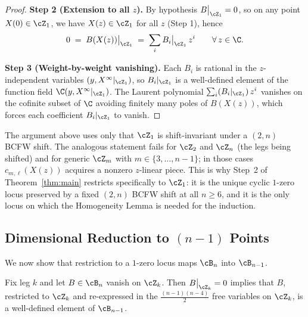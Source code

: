 \begin{proof}
\textbf{Step 2 (Extension to all $z$).}
By hypothesis $B\big|_{\cZ_1} = 0$, so on any point
$X(0) \in \cZ_1$, we have $X(z) \in \cZ_1$ for all $z$
(Step 1), hence
\[
  0 \;=\; B(X(z))\big|_{\cZ_1}
  \;=\; \sum_i B_i\big|_{\cZ_1}\, z^i
  \qquad \forall\, z \in \C.
\]

\textbf{Step 3 (Weight-by-weight vanishing).}
Each $B_i$ is rational in the $z$-independent variables
$(y, X^\infty|_{\cZ_1})$, so $B_i|_{\cZ_1}$ is a
well-defined element of the function field
$\C(y, X^\infty|_{\cZ_1})$. The Laurent polynomial
$\sum_i (B_i|_{\cZ_1})\, z^i$ vanishes on the cofinite subset
of $\C$ avoiding finitely many poles of $B(X(z))$, which
forces each coefficient $B_i|_{\cZ_1}$ to vanish.
\end{proof}

\begin{remark}
\label{rmk:leg1}
The argument above uses only that $\cZ_1$ is shift-invariant
under a $(2,n)$ BCFW shift. The analogous statement fails
for $\cZ_2$ and $\cZ_n$ (the legs being shifted) and for
generic $\cZ_m$ with $m \in \{3, \ldots, n-1\}$; in those
cases $c_{m,\ell}(X(z))$ acquires a nonzero $z$-linear piece.
This is why Step~2 of Theorem~\ref{thm:main} restricts
specifically to $\cZ_1$: it is the unique cyclic $1$-zero
locus preserved by a fixed $(2,n)$ BCFW shift at all $n \geq 6$,
and it is the only locus on which the Homogeneity Lemma is
needed for the induction.
\end{remark}

\subsection{Dimensional Reduction to \texorpdfstring{$(n-1)$}{(n-1)} Points}
\label{ssec:dimred}

We now show that restriction to a $1$-zero locus maps
$\cB_n$ into $\cB_{n-1}$.

\begin{proposition}
\label{prop:dimred}
Fix leg $k$ and let $B \in \cB_n$ vanish on $\cZ_k$.
Then $B\big|_{\cZ_k} = 0$ implies that $B$, restricted to
$\cZ_k$ and re-expressed in the
$\frac{(n-1)(n-4)}{2}$ free variables on $\cZ_k$,
is a well-defined element of $\cB_{n-1}$.
\end{proposition}

